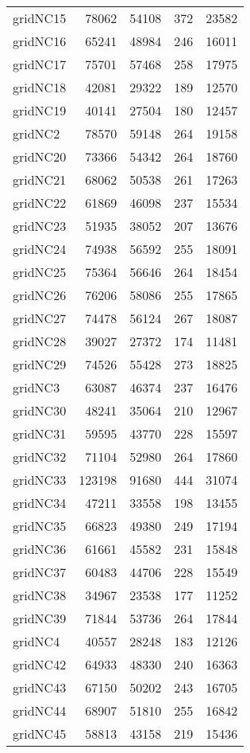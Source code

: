 \begin{tabular}{lrrrr}
gridNC15 & 78062 & 54108 & 372 & 23582 \\
gridNC16 & 65241 & 48984 & 246 & 16011 \\
gridNC17 & 75701 & 57468 & 258 & 17975 \\
gridNC18 & 42081 & 29322 & 189 & 12570 \\
gridNC19 & 40141 & 27504 & 180 & 12457 \\
gridNC2 & 78570 & 59148 & 264 & 19158 \\
gridNC20 & 73366 & 54342 & 264 & 18760 \\
gridNC21 & 68062 & 50538 & 261 & 17263 \\
gridNC22 & 61869 & 46098 & 237 & 15534 \\
gridNC23 & 51935 & 38052 & 207 & 13676 \\
gridNC24 & 74938 & 56592 & 255 & 18091 \\
gridNC25 & 75364 & 56646 & 264 & 18454 \\
gridNC26 & 76206 & 58086 & 255 & 17865 \\
gridNC27 & 74478 & 56124 & 267 & 18087 \\
gridNC28 & 39027 & 27372 & 174 & 11481 \\
gridNC29 & 74526 & 55428 & 273 & 18825 \\
gridNC3 & 63087 & 46374 & 237 & 16476 \\
gridNC30 & 48241 & 35064 & 210 & 12967 \\
gridNC31 & 59595 & 43770 & 228 & 15597 \\
gridNC32 & 71104 & 52980 & 264 & 17860 \\
gridNC33 & 123198 & 91680 & 444 & 31074 \\
gridNC34 & 47211 & 33558 & 198 & 13455 \\
gridNC35 & 66823 & 49380 & 249 & 17194 \\
gridNC36 & 61661 & 45582 & 231 & 15848 \\
gridNC37 & 60483 & 44706 & 228 & 15549 \\
gridNC38 & 34967 & 23538 & 177 & 11252 \\
gridNC39 & 71844 & 53736 & 264 & 17844 \\
gridNC4 & 40557 & 28248 & 183 & 12126 \\
gridNC42 & 64933 & 48330 & 240 & 16363 \\
gridNC43 & 67150 & 50202 & 243 & 16705 \\
gridNC44 & 68907 & 51810 & 255 & 16842 \\
gridNC45 & 58813 & 43158 & 219 & 15436 \\

\end{tabular}
